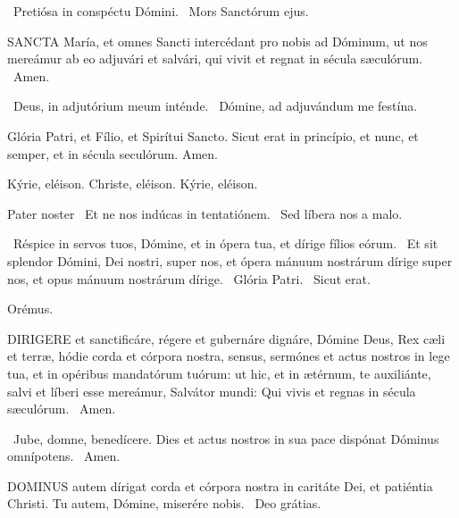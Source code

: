 
\V\ Pretiósa in conspéctu Dómini. \R\ Mors Sanctórum ejus.



\lettrine[lines=2]{S}{ANCTA} María, et omnes Sancti intercédant pro nobis ad Dóminum, ut nos mereámur ab eo adjuvári et salvári, qui vivit et regnat in sécula sæculórum. \R\ Amen.

\V\ Deus, in adjutórium meum inténde. \R\ Dómine, ad adjuvándum me festína.

 Glória Patri, et Fílio, et Spirítui Sancto. Sicut erat in princípio, et nunc, et semper, et in sécula seculórum. Amen.

Kýrie, eléison. Christe, eléison. Kýrie, eléison.

Pater noster  \V\ Et ne nos indúcas in tentatiónem. \R\ Sed líbera nos a malo.

\V\ Réspice in servos tuos, Dómine, et in ópera tua, et dírige fílios eórum. \R\ Et sit splendor Dómini, Dei nostri, super nos, et ópera mánuum nostrárum dírige super nos, et opus mánuum nostrárum dírige. \V\ Glória Patri. \R\ Sicut erat.

Orémus. 

\lettrine[lines=2]{D}{IRIGERE} et sanctificáre, régere et gubernáre dignáre, Dómine Deus, Rex cæli et terræ, hódie corda et córpora nostra, sensus, sermónes et actus nostros in lege tua, et in opéribus mandatórum tuórum: ut hic, et in ætérnum, te auxiliánte, salvi et líberi esse mereámur, Salvátor mundi: Qui vivis et regnas in sécula sæculórum. \R\ Amen.


\V\ Jube, domne, benedícere.  Dies et actus nostros in sua pace dispónat Dóminus omnípotens. \R\ Amen.




\lettrine[lines=2]{D}{OMINUS} autem dírigat corda et córpora nostra in caritáte Dei, et patiéntia Christi. Tu autem, Dómine, miserére nobis. \R\ Deo grátias.

